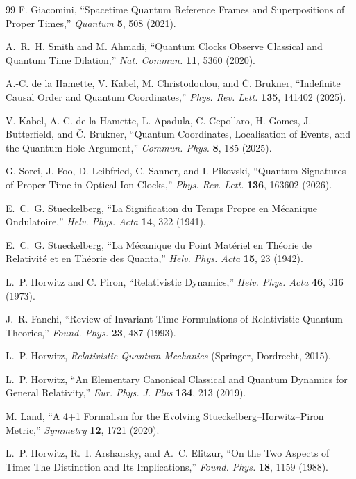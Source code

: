 \documentclass[11pt]{article}
\begin{document}
\begin{thebibliography}{99}
 F. Giacomini, ``Spacetime Quantum Reference Frames and Superpositions of Proper Times,'' \textit{Quantum} \textbf{5}, 508 (2021).

 A.~R.~H. Smith and M. Ahmadi, ``Quantum Clocks Observe Classical and Quantum Time Dilation,'' \textit{Nat. Commun.} \textbf{11}, 5360 (2020).

 A.-C. de la Hamette, V. Kabel, M. Christodoulou, and \v{C}. Brukner, ``Indefinite Causal Order and Quantum Coordinates,'' \textit{Phys. Rev. Lett.} \textbf{135}, 141402 (2025).

 V. Kabel, A.-C. de la Hamette, L. Apadula, C. Cepollaro, H. Gomes, J. Butterfield, and \v{C}. Brukner, ``Quantum Coordinates, Localisation of Events, and the Quantum Hole Argument,'' \textit{Commun. Phys.} \textbf{8}, 185 (2025).

 G. Sorci, J. Foo, D. Leibfried, C. Sanner, and I. Pikovski, ``Quantum Signatures of Proper Time in Optical Ion Clocks,'' \textit{Phys. Rev. Lett.} \textbf{136}, 163602 (2026).

 E.~C.~G. Stueckelberg, ``La Signification du Temps Propre en M\'ecanique Ondulatoire,'' \textit{Helv. Phys. Acta} \textbf{14}, 322 (1941).

 E.~C.~G. Stueckelberg, ``La M\'ecanique du Point Mat\'eriel en Th\'eorie de Relativit\'e et en Th\'eorie des Quanta,'' \textit{Helv. Phys. Acta} \textbf{15}, 23 (1942).

 L.~P. Horwitz and C. Piron, ``Relativistic Dynamics,'' \textit{Helv. Phys. Acta} \textbf{46}, 316 (1973).

 J.~R. Fanchi, ``Review of Invariant Time Formulations of Relativistic Quantum Theories,'' \textit{Found. Phys.} \textbf{23}, 487 (1993).

 L.~P. Horwitz, \textit{Relativistic Quantum Mechanics} (Springer, Dordrecht, 2015).

 L.~P. Horwitz, ``An Elementary Canonical Classical and Quantum Dynamics for General Relativity,'' \textit{Eur. Phys. J. Plus} \textbf{134}, 213 (2019).

 M. Land, ``A 4+1 Formalism for the Evolving Stueckelberg--Horwitz--Piron Metric,'' \textit{Symmetry} \textbf{12}, 1721 (2020).

 L.~P. Horwitz, R.~I. Arshansky, and A.~C. Elitzur, ``On the Two Aspects of Time: The Distinction and Its Implications,'' \textit{Found. Phys.} \textbf{18}, 1159 (1988).


\end{thebibliography}
\end{document}
